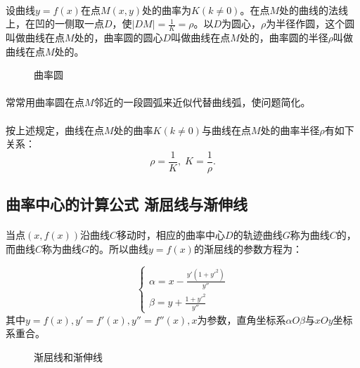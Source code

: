\paragraph{}
设曲线$y=f(x)$在点$M(x,y)$处的曲率为$K(k\neq0)$。在点$M$处的曲线的法线上，在凹的一侧取一点$D$，使$\displaystyle|DM|=\frac{1}{K}=\rho$。以$D$为圆心，$\rho$为半径作圆，这个圆叫做曲线在点$M$处的，曲率圆的圆心$D$叫做曲线在点$M$处的，曲率圆的半径$\rho$叫做曲线在点$M$处的。

\begin{figure}[H]
\centering
  
  \caption{曲率圆}
  \label{曲率圆}
\end{figure}

\paragraph{}
常常用曲率圆在点$M$邻近的一段圆弧来近似代替曲线弧，使问题简化。

\paragraph{}
按上述规定，曲线在点$M$处的曲率$K(k\neq0)$与曲线在点$M$处的曲率半径$\rho$有如下关系：
\begin{equation}
  \rho=\frac{1}{K}, \; K = \frac{1}{\rho}.
\end{equation}

\subsection{曲率中心的计算公式 渐屈线与渐伸线}
\paragraph{}
当点$(x,f(x))$沿曲线$C$移动时，相应的曲率中心$D$的轨迹曲线$G$称为曲线$C$的，而曲线$C$称为曲线$G$的。所以曲线$y=f(x)$的渐屈线的参数方程为：

\begin{equation}
  \left\{\begin{array}{l}
    \alpha = x - \frac{y'(1+y'^2)}{y''} \\
    \beta = y + \frac{1+y'^2}{y''}
  \end{array} \right.
\end{equation}
其中$y=f(x), y'=f'(x),y''=f''(x), x$为参数，直角坐标系$\alpha O \beta$与$xOy$坐标系重合。

\begin{figure}[H]
\centering
  
  \caption{渐屈线和渐伸线}
  \label{渐屈线和渐伸线}
\end{figure}
